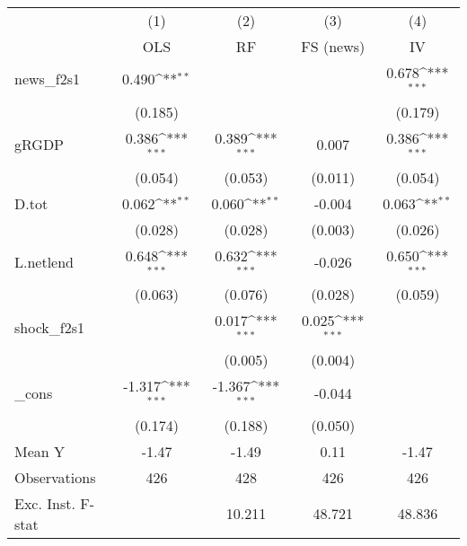 {
\def\sym#1{\ifmmode^{#1}\else\(^{#1}\)\fi}
\begin{tabular}{l*{4}{c}}
\toprule
            &\multicolumn{1}{c}{(1)}&\multicolumn{1}{c}{(2)}&\multicolumn{1}{c}{(3)}&\multicolumn{1}{c}{(4)}\\
            &\multicolumn{1}{c}{OLS}&\multicolumn{1}{c}{RF}&\multicolumn{1}{c}{FS (news)}&\multicolumn{1}{c}{IV}\\
\midrule
news\_f2s1   &       0.490\sym{**} &                     &                     &       0.678\sym{***}\\
            &     (0.185)         &                     &                     &     (0.179)         \\
\addlinespace
gRGDP       &       0.386\sym{***}&       0.389\sym{***}&       0.007         &       0.386\sym{***}\\
            &     (0.054)         &     (0.053)         &     (0.011)         &     (0.054)         \\
\addlinespace
D.tot       &       0.062\sym{**} &       0.060\sym{**} &      -0.004         &       0.063\sym{**} \\
            &     (0.028)         &     (0.028)         &     (0.003)         &     (0.026)         \\
\addlinespace
L.netlend   &       0.648\sym{***}&       0.632\sym{***}&      -0.026         &       0.650\sym{***}\\
            &     (0.063)         &     (0.076)         &     (0.028)         &     (0.059)         \\
\addlinespace
shock\_f2s1  &                     &       0.017\sym{***}&       0.025\sym{***}&                     \\
            &                     &     (0.005)         &     (0.004)         &                     \\
\addlinespace
\_cons      &      -1.317\sym{***}&      -1.367\sym{***}&      -0.044         &                     \\
            &     (0.174)         &     (0.188)         &     (0.050)         &                     \\
\midrule
Mean Y      &       -1.47         &       -1.49         &        0.11         &       -1.47         \\
Observations&         426         &         428         &         426         &         426         \\
Exc. Inst. F-stat&                     &      10.211         &      48.721         &      48.836         \\
\bottomrule
\end{tabular}
}
